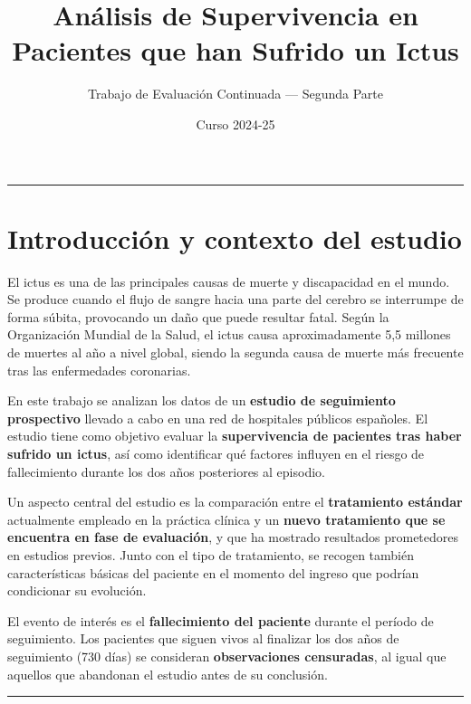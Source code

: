 \documentclass[
]{article}
\title{Análisis de Supervivencia en Pacientes que han Sufrido un Ictus}
\subtitle{Trabajo de Evaluación Continuada --- Segunda Parte}
\author{}
\date{\vspace{-2.5em}Curso 2024-25}
\begin{document}
\maketitle

{
\setcounter{tocdepth}{2}
\tableofcontents
}
\begin{center}\rule{0.5\linewidth}{0.5pt}\end{center}

\hypertarget{introducciuxf3n-y-contexto-del-estudio}{%
\section{Introducción y contexto del
estudio}\label{introducciuxf3n-y-contexto-del-estudio}}

El ictus es una de las principales causas de muerte y discapacidad en el
mundo. Se produce cuando el flujo de sangre hacia una parte del cerebro
se interrumpe de forma súbita, provocando un daño que puede resultar
fatal. Según la Organización Mundial de la Salud, el ictus causa
aproximadamente 5,5 millones de muertes al año a nivel global, siendo la
segunda causa de muerte más frecuente tras las enfermedades coronarias.

En este trabajo se analizan los datos de un \textbf{estudio de
seguimiento prospectivo} llevado a cabo en una red de hospitales
públicos españoles. El estudio tiene como objetivo evaluar la
\textbf{supervivencia de pacientes tras haber sufrido un ictus}, así
como identificar qué factores influyen en el riesgo de fallecimiento
durante los dos años posteriores al episodio.

Un aspecto central del estudio es la comparación entre el
\textbf{tratamiento estándar} actualmente empleado en la práctica
clínica y un \textbf{nuevo tratamiento que se encuentra en fase de
evaluación}, y que ha mostrado resultados prometedores en estudios
previos. Junto con el tipo de tratamiento, se recogen también
características básicas del paciente en el momento del ingreso que
podrían condicionar su evolución.

El evento de interés es el \textbf{fallecimiento del paciente} durante
el período de seguimiento. Los pacientes que siguen vivos al finalizar
los dos años de seguimiento (730 días) se consideran
\textbf{observaciones censuradas}, al igual que aquellos que abandonan
el estudio antes de su conclusión.

\begin{center}\rule{0.5\linewidth}{0.5pt}\end{center}
\end{document}
